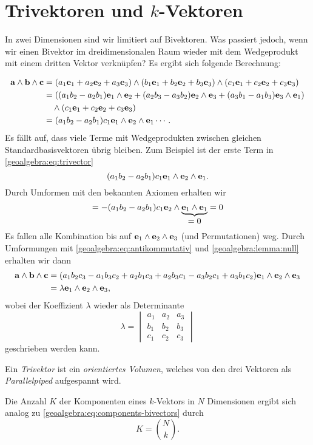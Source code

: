 \section{Trivektoren und $k$-Vektoren}
\label{geoalgebra:section:trivectors-n-vectors}
In zwei Dimensionen sind wir limitiert auf Bivektoren. Was passiert jedoch, wenn wir einen Bivektor
im dreidimensionalen Raum wieder mit dem Wedgeprodukt mit einem dritten Vektor verknüpfen?
Es ergibt sich folgende Berechnung:
{
\begin{align} 
\mathbf{a} \wedge \mathbf{b} \wedge \mathbf{c}
&=
(a_1 \mathbf{e}_1 + a_2 \mathbf{e}_2 + a_3 \mathbf{e}_3) \wedge (b_1 \mathbf{e}_1 + b_2 \mathbf{e}_2 + b_3 \mathbf{e}_3) \wedge (c_1 \mathbf{e}_1 + c_2 \mathbf{e}_2 + c_3 \mathbf{e}_3)
\notag
\\
&=
((a_1 b_2 - a_2 b_1) \mathbf{e}_1 \wedge \mathbf{e}_2 +(a_2 b_3 - a_3 b_2) \mathbf{e}_2 \wedge \mathbf{e}_3 +(a_3 b_1 - a_1 b_3) \mathbf{e}_3 \wedge \mathbf{e}_1)
\notag
\\
&\quad\wedge (c_1 \mathbf{e}_1 + c_2 \mathbf{e}_2 + c_3 \mathbf{e}_3)
\notag
\\
&=
(a_1 b_2 - a_2 b_1) c_1 \mathbf{e}_1 \wedge \mathbf{e}_2 \wedge \mathbf{e}_1 \cdots.
\label{geoalgebra:eq:trivector}
\end{align}
Es fällt auf, dass viele Terme mit Wedgeprodukten zwischen gleichen Standardbasisvektoren übrig bleiben. Zum Beispiel ist der erste Term in \eqref{geoalgebra:eq:trivector}
\begin{equation*}
(a_1 b_2 - a_2 b_1) c_1 \mathbf{e}_1 \wedge \mathbf{e}_2 \wedge \mathbf{e}_1.
\end{equation*}
Durch Umformen mit den bekannten Axiomen erhalten wir
\begin{equation*}
=-(a_1 b_2 - a_2 b_1) c_1 \mathbf{e}_2 \wedge \underbrace{\mathbf{e}_1 \wedge \mathbf{e}_1}_{\displaystyle =0} = 0
\end{equation*}
Es fallen alle Kombination bis auf $\mathbf{e}_1 \wedge \mathbf{e}_2 \wedge \mathbf{e}_3$ (und Permutationen) weg.
Durch Umformungen mit
\eqref{geoalgebra:eq:antikommutativ} und
\eqref{geoalgebra:lemma:null}
erhalten wir dann
\begin{align*}
  \mathbf{a} \wedge \mathbf{b} \wedge \mathbf{c} &= (a_1 b_2 c_3 - a_1 b_3 c_2 + a_2 b_1 c_3 + a_2 b_3 c_1 - a_3 b_2 c_1 + a_3 b_1 c_2) \mathbf{e}_1 \wedge \mathbf{e}_2 \wedge \mathbf{e}_3 \\
  &= \lambda \mathbf{e}_1 \wedge \mathbf{e}_2 \wedge \mathbf{e}_3,
\end{align*}
wobei der Koeffizient $\lambda$ wieder als Determinante
%
\begin{equation*}
\lambda = \begin{vmatrix} a_1 & a_2 & a_3 \\ b_1 & b_2 & b_3 \\ c_1 & c_2 & c_3 \end{vmatrix}
\end{equation*}
geschrieben werden kann.

Ein \emph{Trivektor} ist ein \emph{orientiertes Volumen}, welches von den drei Vektoren als \emph{Parallelpiped} aufgespannt wird.
%
%
%

Die Anzahl $K$ der Komponenten eines $k$-Vektors in $N$ Dimensionen ergibt sich analog zu \eqref{geoalgebra:eq:components-bivectors} durch
\begin{equation*}
  K = \binom{N}{k}.
\end{equation*}
}
